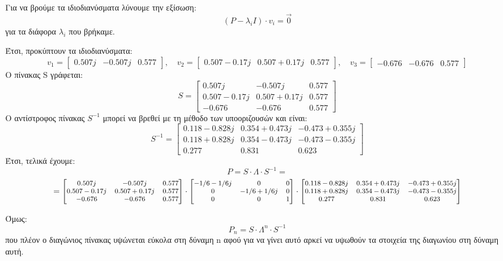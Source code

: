\documentclass[a4paper,oneside, 11pt]{article}
\begin{document}
Για να βρούμε τα ιδιοδιανύσματα λύνουμε την εξίσωση:
$$
(P - \lambda_i I)\cdot v_i = \vec 0
$$
για τα διάφορα $\lambda_i$ που βρήκαμε. \bigbreak 

Έτσι, προκύπτουν τα ιδιοδιανύσματα:
$$
v_1 = \begin{bmatrix}
0.507j & -0.507j & 0.577
\end{bmatrix}, \quad
v_2 = \begin{bmatrix}
	0.507 - 0.17j & 0.507 + 0.17j & 0.577
\end{bmatrix}, \quad 
v_3 = \begin{bmatrix}
	-0.676 & -0.676 & 0.577
\end{bmatrix}
$$
Ο πίνακας S γράφεται:
$$
S = \begin{bmatrix}
0.507j & -0.507j & 0.577 \\
0.507 - 0.17j & 0.507 + 0.17j & 0.577 \\ 
-0.676 & -0.676 & 0.577
\end{bmatrix}
$$
Ο αντίστροφος πίνακας $S^{-1}$ μπορεί να βρεθεί με τη μέθοδο των υποοριζουσών και είναι:
$$
S^{-1} = \begin{bmatrix}
0.118 - 0.828j & 0.354 + 0.473j & -0.473 + 0.355j \\
0.118 + 0.828j & 0.354 - 0.473j & -0.473 - 0.355j \\
0.277 & 0.831 & 0.623
\end{bmatrix}
$$
Έτσι, τελικά έχουμε:
$$
P = S \cdot \Lambda \cdot S^{-1} = 
$$
$$
= \footnotesize{\begin{bmatrix}
0.507j & -0.507j & 0.577 \\
0.507 - 0.17j & 0.507 + 0.17j & 0.577 \\ 
-0.676 & -0.676 & 0.577
\end{bmatrix} \cdot \begin{bmatrix}
-1/6 -1/6j & 0 & 0 \\
0 & -1/6 +1/6j & 0 \\
0 & 0 & 1 
\end{bmatrix} \cdot \begin{bmatrix}
0.118 - 0.828j & 0.354 + 0.473j & -0.473 + 0.355j \\
0.118 + 0.828j & 0.354 - 0.473j & -0.473 - 0.355j \\
0.277 & 0.831 & 0.623
\end{bmatrix}}
$$


Όμως:
$$
P_n = S \cdot \Lambda^n \cdot S^{-1}
$$
που πλέον ο διαγώνιος πίνακας υψώνεται εύκολα στη δύναμη n αφού για να γίνει αυτό αρκεί να υψωθούν τα στοιχεία της διαγωνίου στη δύναμη αυτή.
\end{document}
